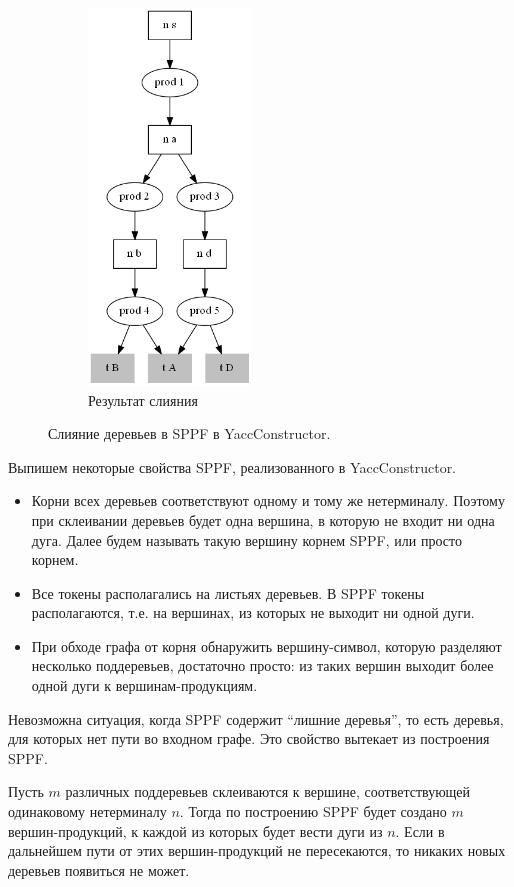 \begin{figure}[h]
\begin{subfigure}{0.25\textwidth}
        \includegraphics[height=100mm]{Pictures/SPPF_YC.png}
        \caption*{Результат слияния}
    \end{subfigure}
    \qquad
    \caption{Слияние деревьев в SPPF в YaccConstructor.}
    \label{sppf_yc}
\end{figure}

Выпишем некоторые свойства SPPF, реализованного в YaccConstructor. 
\begin{itemize}
\item Корни всех деревьев соответствуют одному и тому же нетерминалу. Поэтому при склеивании деревьев будет одна вершина, в которую не входит ни одна дуга. Далее будем называть такую вершину корнем SPPF, или просто корнем. 
\item Все токены располагались на листьях деревьев. В SPPF токены располагаются, т.е. на вершинах, из которых не выходит ни одной дуги.
\item При обходе графа от корня обнаружить вершину-символ, которую разделяют несколько поддеревьев, достаточно просто: из таких вершин выходит более одной дуги к вершинам-продукциям. 
\end{itemize}

Невозможна ситуация, когда SPPF содержит “лишние деревья”, то есть деревья, для которых нет пути во входном графе. Это свойство вытекает из построения SPPF. 

Пусть $m$ различных поддеревьев склеиваются к вершине, соответствующей одинаковому нетерминалу $n$. Тогда по построению SPPF будет создано $m$ вершин-продукций, к каждой из которых будет вести дуги из $n$. Если в дальнейшем пути от этих вершин-продукций не пересекаются, то никаких новых деревьев появиться не может. 

